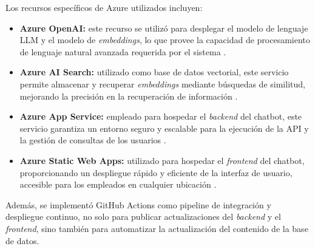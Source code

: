 Los recursos específicos de Azure utilizados incluyen:

\begin{itemize}
	\item \textbf{Azure OpenAI:} este recurso se utilizó para desplegar el modelo de lenguaje LLM y el modelo de \textit{embeddings}, 
	lo que provee la capacidad de procesamiento de lenguaje natural avanzada requerida por el sistema \citep{website:azure-openai}.
	\item \textbf{Azure AI Search:} utilizado como base de datos vectorial, este servicio permite almacenar y recuperar \textit{embeddings} 
	mediante búsquedas de similitud, mejorando la precisión en la recuperación de información \citep{website:ai-search}.
	\item \textbf{Azure App Service:} empleado para hospedar el \textit{backend} del chatbot, este servicio garantiza un entorno seguro y 
	escalable para la ejecución de la API y la gestión de consultas de los usuarios \citep{website:app-service}.
	\item \textbf{Azure Static Web Apps:} utilizado para hospedar el \textit{frontend} del chatbot, proporcionando un despliegue 
	rápido y eficiente de la interfaz de usuario, accesible para los empleados en cualquier ubicación \citep{website:static-web-app}.
\end{itemize}

Además, se implementó GitHub Actions \citep{website:github-actions} como pipeline de integración y despliegue continuo, no solo para publicar 
actualizaciones del \textit{backend} y el \textit{frontend}, sino también para automatizar la actualización del contenido de la base de datos.